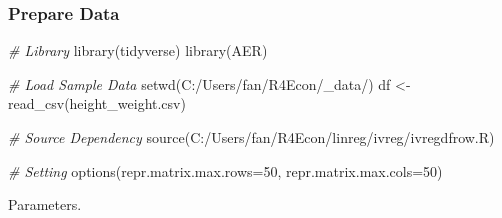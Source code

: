\documentclass[
]{book}
\newenvironment{Shaded}{\begin{snugshade}}{\end{snugshade}}
\newcommand{\AttributeTok}[1]{\textcolor[rgb]{0.77,0.63,0.00}{#1}}
\newcommand{\CommentTok}[1]{\textcolor[rgb]{0.56,0.35,0.01}{\textit{#1}}}
\newcommand{\DecValTok}[1]{\textcolor[rgb]{0.00,0.00,0.81}{#1}}
\newcommand{\FunctionTok}[1]{\textcolor[rgb]{0.00,0.00,0.00}{#1}}
\newcommand{\NormalTok}[1]{#1}
\newcommand{\OtherTok}[1]{\textcolor[rgb]{0.56,0.35,0.01}{#1}}
\newcommand{\StringTok}[1]{\textcolor[rgb]{0.31,0.60,0.02}{#1}}
\begin{document}
\hypertarget{prepare-data}{%
\subsubsection{Prepare Data}\label{prepare-data}}

\begin{Shaded}
\begin{Highlighting}[]
\CommentTok{\# Library}
\FunctionTok{library}\NormalTok{(tidyverse)}
\FunctionTok{library}\NormalTok{(AER)}

\CommentTok{\# Load Sample Data}
\FunctionTok{setwd}\NormalTok{(}\StringTok{\textquotesingle{}C:/Users/fan/R4Econ/\_data/\textquotesingle{}}\NormalTok{)}
\NormalTok{df }\OtherTok{\textless{}{-}} \FunctionTok{read\_csv}\NormalTok{(}\StringTok{\textquotesingle{}height\_weight.csv\textquotesingle{}}\NormalTok{)}

\CommentTok{\# Source Dependency}
\FunctionTok{source}\NormalTok{(}\StringTok{\textquotesingle{}C:/Users/fan/R4Econ/linreg/ivreg/ivregdfrow.R\textquotesingle{}}\NormalTok{)}

\CommentTok{\# Setting}
\FunctionTok{options}\NormalTok{(}\AttributeTok{repr.matrix.max.rows=}\DecValTok{50}\NormalTok{, }\AttributeTok{repr.matrix.max.cols=}\DecValTok{50}\NormalTok{)}
\end{Highlighting}
\end{Shaded}

Parameters.
\end{document}
